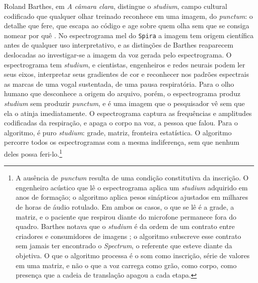 Roland Barthes, em \textit{A câmara clara}, distingue o \textit{studium}, campo cultural codificado que qualquer olhar treinado reconhece em uma imagem, do \textit{punctum}: o detalhe que fere, que escapa ao código e age sobre quem olha sem que se consiga nomear por quê \parencite[pp.~44--47]{Barthes1984}. No espectrograma mel do \texttt{Spira} a imagem tem origem científica antes de qualquer uso interpretativo, e as distinções de Barthes reaparecem deslocadas ao investigar-se a imagem da voz gerada pelo espectrograma. O espectrograma tem \textit{studium}, e cientistas, engenheiros e redes neurais podem ler seus eixos, interpretar seus gradientes de cor e reconhecer nos padrões espectrais as marcas de uma vogal sustentada, de uma pausa respiratória. Para o olho humano que desconhece a origem do arquivo, porém, o espectrograma produz \textit{studium} sem produzir \textit{punctum}, e é uma imagem que o pesquisador vê sem que ela o atinja imediatamente. O espectrograma captura as frequências e amplitudes codificadas da respiração, e apaga o corpo na voz, a pessoa que falou. Para o algoritmo, é puro \textit{studium}: grade, matriz, fronteira estatística. O algoritmo percorre todos os espectrogramas com a mesma indiferença, sem que nenhum deles possa feri-lo.\footnote{A ausência de \textit{punctum} resulta de uma condição constitutiva da inscrição. O engenheiro acústico que lê o espectrograma aplica um \textit{studium} adquirido em anos de formação; o algoritmo aplica pesos sinápticos ajustados em milhares de horas de áudio rotulado. Em ambos os casos, o que se lê é a grade, a matriz, e o paciente que respirou diante do microfone permanece fora do quadro. Barthes notava que o \textit{studium} é da ordem de um contrato entre criadores e consumidores de imagens \parencite[p.~48]{Barthes1984}; o algoritmo subscreve esse contrato sem jamais ter encontrado o \textit{Spectrum}, o referente que esteve diante da objetiva. O que o algoritmo processa é o som como inscrição, série de valores em uma matriz, e não o que a voz carrega como grão, como corpo, como presença que a cadeia de translação apagou a cada etapa.}

